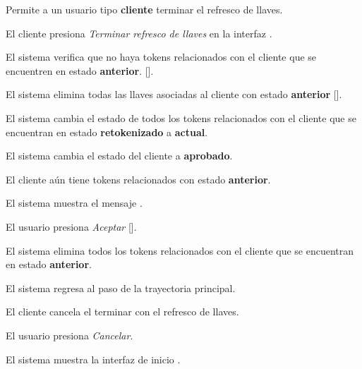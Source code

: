 %
%

{
  Permite a un usuario tipo \textbf{cliente} terminar el refresco de llaves.

  \begin{trayectoriaPrincipal}

    \item El cliente presiona \textit{Terminar refresco de llaves} en la
      interfaz .

    \item El sistema verifica que no haya tokens relacionados con el cliente
      que se encuentren en estado \textbf{anterior}.
      [].

    \item[llaves] El sistema elimina todas las llaves asociadas al cliente con
      estado \textbf{anterior} [].

    \item El sistema cambia el estado de todos los tokens relacionados con el
      cliente que se encuentran en estado \textbf{retokenizado} a
      \textbf{actual}.

    \item El sistema cambia el estado del cliente a \textbf{aprobado}.

  \end{trayectoriaPrincipal}

  \begin{trayectoriaAlternativa}
    {El cliente aún tiene tokens relacionados con estado \textbf{anterior}.}

    \item El sistema muestra el mensaje
      .

    \item El usuario presiona \textit{Aceptar}
      [].

    \item El sistema elimina todos los tokens relacionados con el cliente que se
      encuentran en estado \textbf{anterior}.

    \item El sistema regresa al paso  de la trayectoria
      principal.

  \end{trayectoriaAlternativa}

  \begin{trayectoriaAlternativa}
    {El cliente cancela el terminar con el refresco de llaves.}

    \item El usuario presiona \textit{Cancelar}.

    \item El sistema muestra la interfaz de inicio
      .

  \end{trayectoriaAlternativa}
}
